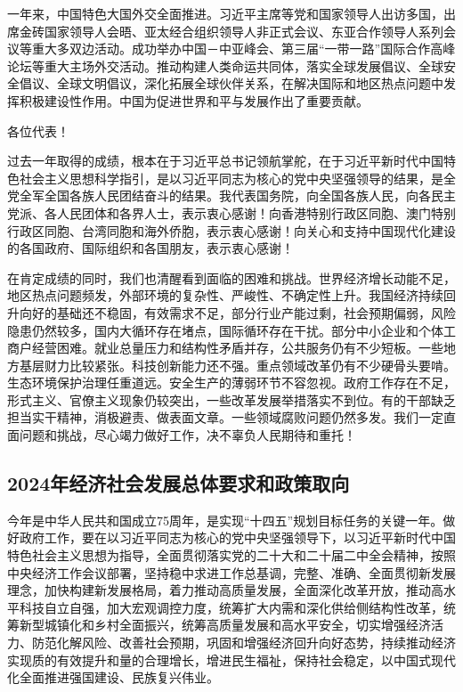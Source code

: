 \documentclass[10pt, UTF8]{ctexbook} %
\begin{document}
一年来，中国特色大国外交全面推进。习近平主席等党和国家领导人出访多国，出席金砖国家领导人会晤、亚太经合组织领导人非正式会议、东亚合作领导人系列会议等重大多双边活动。成功举办中国－中亚峰会、第三届“一带一路”国际合作高峰论坛等重大主场外交活动。推动构建人类命运共同体，落实全球发展倡议、全球安全倡议、全球文明倡议，深化拓展全球伙伴关系，在解决国际和地区热点问题中发挥积极建设性作用。中国为促进世界和平与发展作出了重要贡献。

各位代表！

过去一年取得的成绩，根本在于习近平总书记领航掌舵，在于习近平新时代中国特色社会主义思想科学指引，是以习近平同志为核心的党中央坚强领导的结果，是全党全军全国各族人民团结奋斗的结果。我代表国务院，向全国各族人民，向各民主党派、各人民团体和各界人士，表示衷心感谢！向香港特别行政区同胞、澳门特别行政区同胞、台湾同胞和海外侨胞，表示衷心感谢！向关心和支持中国现代化建设的各国政府、国际组织和各国朋友，表示衷心感谢！

在肯定成绩的同时，我们也清醒看到面临的困难和挑战。世界经济增长动能不足，地区热点问题频发，外部环境的复杂性、严峻性、不确定性上升。我国经济持续回升向好的基础还不稳固，有效需求不足，部分行业产能过剩，社会预期偏弱，风险隐患仍然较多，国内大循环存在堵点，国际循环存在干扰。部分中小企业和个体工商户经营困难。就业总量压力和结构性矛盾并存，公共服务仍有不少短板。一些地方基层财力比较紧张。科技创新能力还不强。重点领域改革仍有不少硬骨头要啃。生态环境保护治理任重道远。安全生产的薄弱环节不容忽视。政府工作存在不足，形式主义、官僚主义现象仍较突出，一些改革发展举措落实不到位。有的干部缺乏担当实干精神，消极避责、做表面文章。一些领域腐败问题仍然多发。我们一定直面问题和挑战，尽心竭力做好工作，决不辜负人民期待和重托！

\subsection{2024年经济社会发展总体要求和政策取向}

今年是中华人民共和国成立75周年，是实现“十四五”规划目标任务的关键一年。做好政府工作，要在以习近平同志为核心的党中央坚强领导下，以习近平新时代中国特色社会主义思想为指导，全面贯彻落实党的二十大和二十届二中全会精神，按照中央经济工作会议部署，坚持稳中求进工作总基调，完整、准确、全面贯彻新发展理念，加快构建新发展格局，着力推动高质量发展，全面深化改革开放，推动高水平科技自立自强，加大宏观调控力度，统筹扩大内需和深化供给侧结构性改革，统筹新型城镇化和乡村全面振兴，统筹高质量发展和高水平安全，切实增强经济活力、防范化解风险、改善社会预期，巩固和增强经济回升向好态势，持续推动经济实现质的有效提升和量的合理增长，增进民生福祉，保持社会稳定，以中国式现代化全面推进强国建设、民族复兴伟业。
\end{document}
